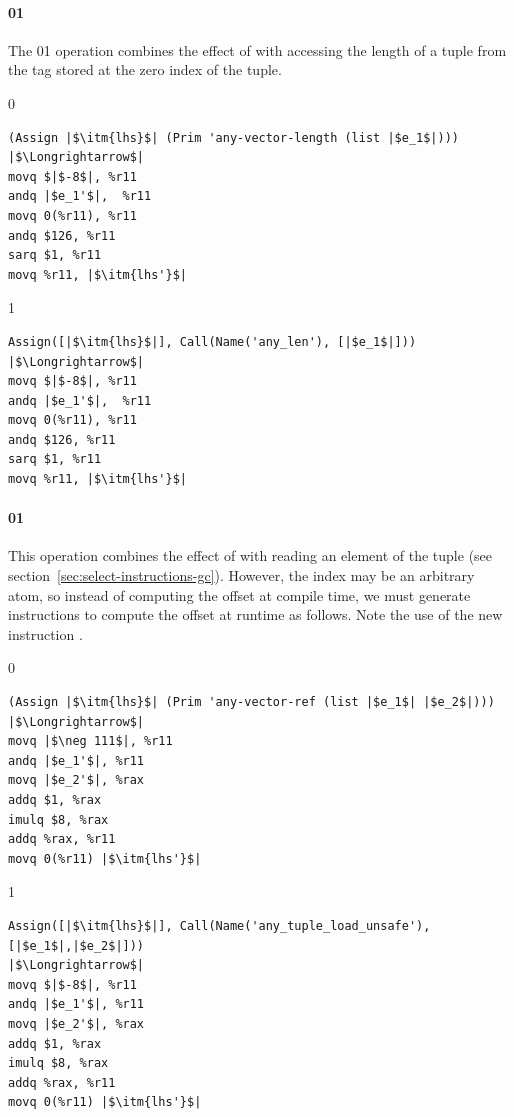 \documentclass[7x10]{TimesAPriori_MIT}%
\def\racketEd{0}
\def\pythonEd{1}
\providecommand{\BookEdition}{1}
\let\edition\BookEdition
\newcommand{\racket}[1]{{\if\edition\racketEd{#1}\fi}}
\newcommand{\pythonColor}[0]{}
\newcommand{\python}[1]{{\if\edition\pythonEd\pythonColor #1\fi}}
\numberwithin{theorem}{chapter}
\numberwithin{definition}{chapter}
\numberwithin{equation}{chapter}
\begin{document}

\paragraph{\racket{}\python{}}

The \racket{\code{any-vector-length}}\python{}
operation combines the effect of  with accessing the
length of a tuple from the tag stored at the zero index of the tuple.

{\if\edition\racketEd
\begin{lstlisting}
(Assign |$\itm{lhs}$| (Prim 'any-vector-length (list |$e_1$|)))
|$\Longrightarrow$|
movq $|$-8$|, %r11
andq |$e_1'$|,  %r11
movq 0(%r11), %r11
andq $126, %r11
sarq $1, %r11
movq %r11, |$\itm{lhs'}$|
\end{lstlisting}
\fi}
{\if\edition\pythonEd\pythonColor
\begin{lstlisting}
Assign([|$\itm{lhs}$|], Call(Name('any_len'), [|$e_1$|]))
|$\Longrightarrow$|
movq $|$-8$|, %r11
andq |$e_1'$|,  %r11
movq 0(%r11), %r11
andq $126, %r11
sarq $1, %r11
movq %r11, |$\itm{lhs'}$|
\end{lstlisting}
\fi}

\paragraph{\racket{}\python{}}

This operation combines the effect of  with reading an
element of the tuple (see
section~\ref{sec:select-instructions-gc}). However, the index may be
an arbitrary atom, so instead of computing the offset at compile time,
we must generate instructions to compute the offset at runtime as
follows. Note the use of the new instruction .
\begin{center}
\begin{minipage}{0.96\textwidth}
{\if\edition\racketEd    
\begin{lstlisting}
(Assign |$\itm{lhs}$| (Prim 'any-vector-ref (list |$e_1$| |$e_2$|)))
|$\Longrightarrow$|
movq |$\neg 111$|, %r11
andq |$e_1'$|, %r11
movq |$e_2'$|, %rax
addq $1, %rax
imulq $8, %rax
addq %rax, %r11
movq 0(%r11) |$\itm{lhs'}$|
\end{lstlisting}
\fi}
%
{\if\edition\pythonEd\pythonColor    
\begin{lstlisting}
Assign([|$\itm{lhs}$|], Call(Name('any_tuple_load_unsafe'), [|$e_1$|,|$e_2$|]))
|$\Longrightarrow$|
movq $|$-8$|, %r11
andq |$e_1'$|, %r11
movq |$e_2'$|, %rax
addq $1, %rax
imulq $8, %rax
addq %rax, %r11
movq 0(%r11) |$\itm{lhs'}$|
\end{lstlisting}
\fi}
\end{minipage}
\end{center}
\end{document}

